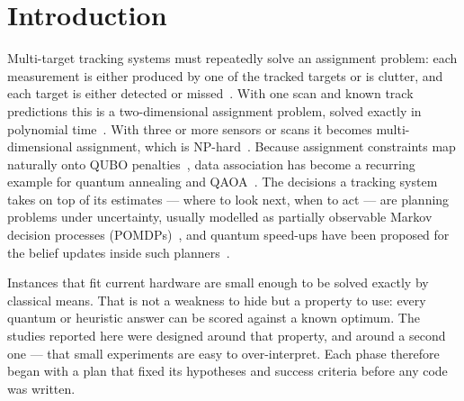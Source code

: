 \documentclass[11pt,a4paper]{article}
\begin{document}
\section{Introduction}

Multi-target tracking systems must repeatedly solve an assignment problem: each measurement is either produced by one of the
tracked targets or is clutter, and each target is either detected or missed~\cite{barshalom1995}. With one scan and known track
predictions this is a two-dimensional assignment problem, solved exactly in polynomial time~\cite{kuhn1955}. With three or more
sensors or scans it becomes multi-dimensional assignment, which is NP-hard~\cite{deb1997sd}. Because assignment constraints map
naturally onto QUBO penalties~\cite{lucas2014ising}, data association has become a recurring example for quantum annealing and
QAOA~\cite{farhi2014qaoa,govaers2021mtda,mccormick2022mtt,zaech2022amot,ihara2025mot,eker2026qantis}. The decisions a tracking system
takes on top of its estimates --- where to look next, when to act --- are planning problems under uncertainty, usually modelled as
partially observable Markov decision processes (POMDPs)~\cite{kaelbling1998planning}, and quantum speed-ups have been proposed for the
belief updates inside such planners~\cite{eker2026qantis}.

Instances that fit current hardware are small enough to be solved exactly by classical means. That is not a weakness to hide but a
property to use: every quantum or heuristic answer can be scored against a known optimum. The studies reported here were designed
around that property, and around a second one --- that small experiments are easy to over-interpret. Each phase therefore began with
a plan that fixed its hypotheses and success criteria before any code was written.
\end{document}

